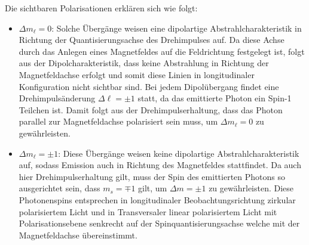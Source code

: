 \documentclass[11pt, a4paper]{article}
\begin{document}
Die sichtbaren Polarisationen erklären sich wie folgt:
\begin{itemize}
	\item $\Delta m_\ell = 0$: Solche Übergänge weisen eine dipolartige Abstrahlcharakteristik in Richtung der Quantisierungsachse des Drehimpulses auf.
	Da diese Achse durch das Anlegen eines Magnetfeldes auf die Feldrichtung festgelegt ist, folgt aus der Dipolcharakteristik, dass keine Abstrahlung in Richtung der Magnetfeldachse erfolgt und somit diese Linien in longitudinaler Konfiguration nicht sichtbar sind.
	Bei jedem Dipolübergang findet eine Drehimpulsänderung $\Delta \ell = \pm 1$ statt, da das emittierte Photon ein Spin-1 Teilchen ist.
	Damit folgt aus der Drehimpulserhaltung, dass das Photon parallel zur Magnetfeldachse polarisiert sein muss, um $\Delta m_\ell = 0$ zu gewährleisten.
	
	\item $\Delta m_\ell = \pm 1$: Diese Übergänge weisen keine dipolartige Abstrahlcharakteristik auf, sodass Emission auch in Richtung des Magnetfeldes stattfindet.
	Da auch hier Drehimpulserhaltung gilt, muss der Spin des emittierten Photons so ausgerichtet sein, dass $m_s = \mp 1$ gilt, um $\Delta m = \pm 1$ zu gewährleisten.
	Diese Photonenspins entsprechen in longitudinaler Beobachtungsrichtung zirkular polarisiertem Licht und in Transversaler linear polarisiertem Licht mit Polarisationsebene senkrecht auf der Spinquantisierungsachse welche mit der Magnetfeldachse übereinstimmt.
\end{itemize}
\end{document}
